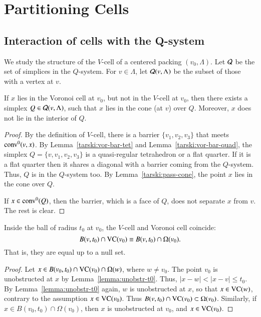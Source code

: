 \chapter{Partitioning Cells}%
    \label{sec:fine}

\section{Interaction of cells with the Q-system}

We study the structure of the $V$-cell of a centered packing $(v_0,\Lambda)$.
Let ${\mathcal Q}$ be the set of simplices
in the $Q$-system.  For $v\in\Lambda$, let ${\mathcal Q}(v,\Lambda)$ be the subset
of those with a vertex at $v$.



\begin{lemma} \label{lemma:voronoi-truncation-over-Q}
If $x$ lies in the  Voronoi cell at $v_0$, 
but not in the $V$-cell at $v_0$, then there exists a
simplex $Q\in{\mathcal Q}(v,\Lambda)$, such that $x$ lies in the cone (at $v$)
over $Q$. Moreover, $x$ does not lie in the interior of $Q$.
\end{lemma}

\begin{proof}
By
the definition of $V$-cell, there is a barrier $\{v_1,v_2,v_3\}$
that meets ${\operatorname{conv}}^0(v,x)$.  
By Lemma~\ref{tarski:vor-bar-tet}
and Lemma~\ref{tarski:vor-bar-quad},
the simplex $Q=\{v,v_1,v_2,v_3\}$ is a quasi-regular tetrahedron
or a flat quarter.  If it is a flat quarter then it shares a diagonal
with a barrier coming from the $Q$-system.  Thus, $Q$ is in
the $Q$-system too.  By Lemma~\ref{tarski:pass-cone}, the
point $x$ lies in the cone over $Q$.

If $x\in{\operatorname{conv}}^0(Q)$, then the barrier, which is a face
of $Q$, does not separate
$x$ from $v$.  The rest is clear.
\end{proof}



\begin{lemma}\label{lemma:VC-Omega}
Inside the ball of radius $t_0$ at $v_0$, the $V$-cell and
Voronoi cell coincide:
   $$B(v,t_0)\cap {\operatorname{VC}}(v_0) \equiv B(v,t_0)\cap \Omega(v_0).$$
That is, they are equal up to a null set.
\end{lemma}

\begin{proof} Let $x\in B(v_0,t_0)\cap {\operatorname{VC}}(v_0)\cap\Omega(w)$, where
$w\ne v_0$.  
The point $v_0$ is
unobstructed  at $x$ by Lemma~\ref{lemma:unobstr-t0}.  
Thus, $|x-w|< |x-v|\le t_0$.  By
Lemma~\ref{lemma:unobstr-t0} again, $w$ is unobstructed at $x$, so
that $x\in {\operatorname{VC}}(w)$, contrary to the assumption
$x\in{\operatorname{VC}}(v_0)$.  Thus $B(v,t_0)\cap{\operatorname{VC}}(v_0)\subset\Omega(v_0)$.
Similarly, if $x\in B(v_0,t_0)\cap \Omega(v_0)$, then $x$ is
unobstructed at $v_0$, and $x\in {\operatorname{VC}}(v_0)$.
\end{proof}

